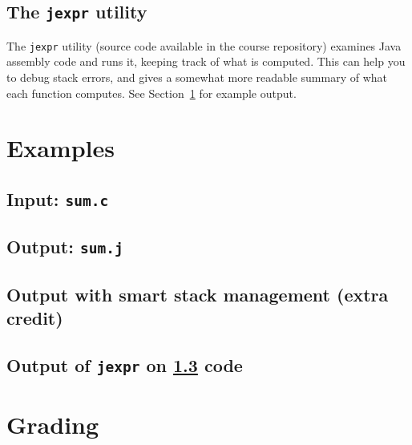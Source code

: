 \documentclass{article}
\begin{document}
\subsection{The {\tt jexpr} utility}

The {\tt jexpr} utility
(source code available in the course repository)
examines Java assembly code and runs it,
keeping track of what is computed.
This can help you to debug stack errors,
and gives a somewhat more readable summary of what each function computes.
See Section~\ref{SEC:examples} for example output.



\section{Examples} \label{SEC:examples}

\subsection{Input: {\tt sum.c}}



\subsection{Output: {\tt sum.j}}



\subsection{Output with smart stack management (extra credit)}
\label{SEC:smartstack}



\subsection{Output of {\tt jexpr} on \ref{SEC:smartstack} code}



\section{Grading} \label{SEC:grading}
\end{document}
